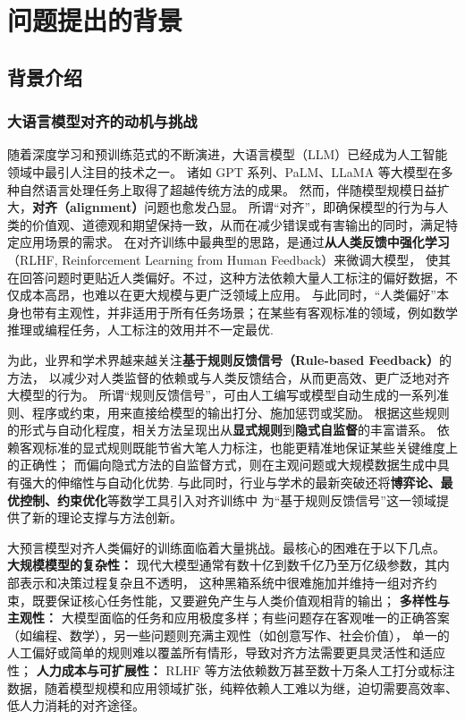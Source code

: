 \section{问题提出的背景}


\subsection{背景介绍}
\subsubsection{大语言模型对齐的动机与挑战}
随着深度学习和预训练范式的不断演进，大语言模型（LLM）已经成为人工智能领域中最引人注目的技术之一。
诸如 GPT 系列、PaLM、LLaMA 等大模型在多种自然语言处理任务上取得了超越传统方法的成果。
然而，伴随模型规模日益扩大，\textbf{对齐（alignment）}问题也愈发凸显。
所谓“对齐”，即确保模型的行为与人类的价值观、道德观和期望保持一致，从而在减少错误或有害输出的同时，满足特定应用场景的需求。
在对齐训练中最典型的思路，是通过\textbf{从人类反馈中强化学习}（RLHF, Reinforcement Learning from Human Feedback）来微调大模型，
使其在回答问题时更贴近人类偏好。不过，这种方法依赖大量人工标注的偏好数据，不仅成本高昂，也难以在更大规模与更广泛领域上应用。
与此同时，“人类偏好”本身也带有主观性，并非适用于所有任务场景；在某些有客观标准的领域，例如数学推理或编程任务，人工标注的效用并不一定最优.

为此，业界和学术界越来越关注\textbf{基于规则反馈信号（Rule-based Feedback）}的方法，
以减少对人类监督的依赖或与人类反馈结合，从而更高效、更广泛地对齐大模型的行为。
所谓“规则反馈信号”，可由人工编写或模型自动生成的一系列准则、程序或约束，用来直接给模型的输出打分、施加惩罚或奖励。
根据这些规则的形式与自动化程度，相关方法呈现出从\textbf{显式规则}到\textbf{隐式自监督}的丰富谱系。
依赖客观标准的显式规则既能节省大笔人力标注，也能更精准地保证某些关键维度上的正确性；
而偏向隐式方法的自监督方式，则在主观问题或大规模数据生成中具有强大的伸缩性与自动化优势.
与此同时，行业与学术的最新突破还将\textbf{博弈论、最优控制、约束优化}等数学工具引入对齐训练中
为“基于规则反馈信号”这一领域提供了新的理论支撑与方法创新。

大预言模型对齐人类偏好的训练面临着大量挑战。最核心的困难在于以下几点。
\textbf{大规模模型的复杂性：}
现代大模型通常有数十亿到数千亿乃至万亿级参数，其内部表示和决策过程复杂且不透明，
这种黑箱系统中很难施加并维持一组对齐约束，既要保证核心任务性能，又要避免产生与人类价值观相背的输出；
\textbf{多样性与主观性：}
大模型面临的任务和应用极度多样；有些问题存在客观唯一的正确答案（如编程、数学），另一些问题则充满主观性（如创意写作、社会价值），
单一的人工偏好或简单的规则难以覆盖所有情形，导致对齐方法需要更具灵活性和适应性；
\textbf{人力成本与可扩展性：}
RLHF 等方法依赖数万甚至数十万条人工打分或标注数据，随着模型规模和应用领域扩张，纯粹依赖人工难以为继，迫切需要高效率、低人力消耗的对齐途径。

